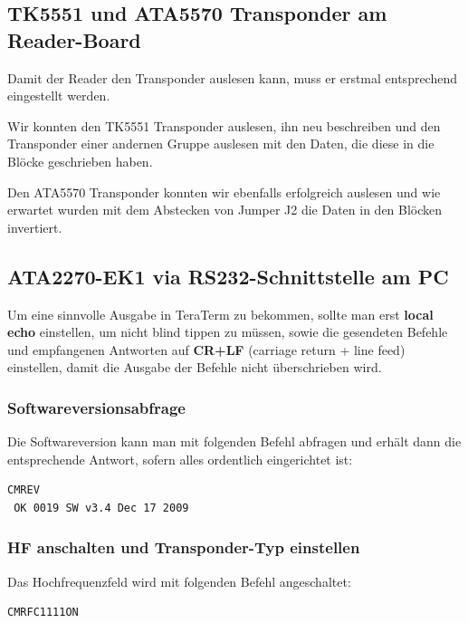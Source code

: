 \documentclass[paper=a4,fontsize=11pt,headsepline,footsepline,parskip=half]{scrartcl}
\begin{document}
\subsection{TK5551 und ATA5570 Transponder am Reader-Board}

Damit der Reader den Transponder auslesen kann, muss er erstmal entsprechend eingestellt werden.

Wir konnten den TK5551 Transponder auslesen, ihn neu beschreiben und den Transponder einer andernen Gruppe auslesen mit den Daten, die
diese in die Blöcke geschrieben haben.

Den ATA5570 Transponder konnten wir ebenfalls erfolgreich auslesen und wie erwartet wurden mit dem Abstecken von Jumper J2 die Daten
in den Blöcken invertiert.

\subsection{ATA2270-EK1 via RS232-Schnittstelle am PC}

Um eine sinnvolle Ausgabe in TeraTerm zu bekommen, sollte man erst \textbf{local echo} einstellen, um nicht blind tippen zu müssen,
sowie die gesendeten Befehle und empfangenen Antworten auf \textbf{CR+LF} (carriage return + line feed) einstellen, damit die Ausgabe der
Befehle nicht überschrieben wird.

\subsubsection{Softwareversionsabfrage}

Die Softwareversion kann man mit folgenden Befehl abfragen und erhält dann die entsprechende Antwort, sofern alles ordentlich eingerichtet ist:

\begin{lstlisting}[caption={Softwareversionsabfrage.}]
 CMREV
 OK 0019 SW v3.4 Dec 17 2009
\end{lstlisting}

\subsubsection{HF anschalten und Transponder-Typ einstellen}

Das Hochfrequenzfeld wird mit folgenden Befehl angeschaltet:

\begin{lstlisting}[caption={HF anschalten.}]
 CMRFC1111ON
\end{lstlisting}
\end{document}
